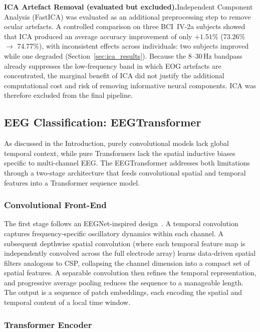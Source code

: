\documentclass[12pt, a4paper]{article}
\begin{document}
\textbf{ICA Artefact Removal (evaluated but excluded).}\quad Independent Component Analysis (FastICA) was evaluated as an additional preprocessing step to remove ocular artefacts. A controlled comparison on three BCI~IV-2a subjects showed that ICA produced an average accuracy improvement of only $+1.51\%$ (73.26\% $\to$ 74.77\%), with inconsistent effects across individuals: two subjects improved while one degraded (Section~\ref{sec:ica_results}). Because the 8--30\,Hz bandpass already suppresses the low-frequency band in which EOG artefacts are concentrated, the marginal benefit of ICA did not justify the additional computational cost and risk of removing informative neural components. ICA was therefore excluded from the final pipeline.

\subsection{EEG Classification: EEGTransformer}

As discussed in the Introduction, purely convolutional models lack global temporal context, while pure Transformers lack the spatial inductive biases specific to multi-channel EEG. The EEGTransformer addresses both limitations through a two-stage architecture that feeds convolutional spatial and temporal features into a Transformer sequence model.

\subsubsection{Convolutional Front-End}

The first stage follows an EEGNet-inspired design~\cite{lawhern2018eegnet}. A temporal convolution captures frequency-specific oscillatory dynamics within each channel. A subsequent depthwise spatial convolution (where each temporal feature map is independently convolved across the full electrode array) learns data-driven spatial filters analogous to CSP, collapsing the channel dimension into a compact set of spatial features. A separable convolution then refines the temporal representation, and progressive average pooling reduces the sequence to a manageable length. The output is a sequence of patch embeddings, each encoding the spatial and temporal content of a local time window.

\subsubsection{Transformer Encoder}
\end{document}

